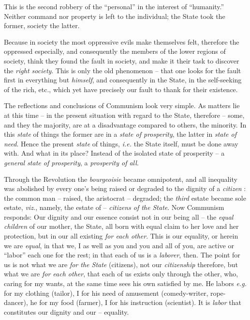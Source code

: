 \documentclass[12pt,a4paper]{book}
\begin{document}
This is the second robbery of the ``personal'' in the interest of 
``humanity.'' Neither command nor property is left to the individual; the 
State took the former, society the latter.

Because in society the most oppressive evils make themselves felt, therefore 
the oppressed especially, and consequently the members of the lower regions of 
society, think they found the fault in society, and make it their task to 
discover the \textit{right society}. This is only the old phenomenon -- that 
one looks for the fault first in everything but \textit{himself}, and 
consequently in the State, in the self-seeking of the rich, etc., which yet 
have precisely our fault to thank for their existence.

 The reflections and conclusions of Communism look very simple. As matters lie 
at this time -- in the present situation with regard to the State, therefore 
-- some, and they the majority, are at a disadvantage compared to others, the 
minority. In this \textit{state} of things the former are in a \textit{state 
of prosperity}, the latter in \textit{state of need}. Hence the present 
\textit{state} of things, \textit{i.e.} the State itself, must be done away 
with. And what in its place? Instead of the isolated state of prosperity -- a 
\textit{general state of prosperity}, a \textit{prosperity of all}.

Through the Revolution the \textit{bourgeoisie} became omnipotent, and all 
inequality was abolished by every one's being raised or degraded to the 
dignity of a \textit{citizen} : the common man -- raised, the aristocrat -- 
degraded; the \textit{third} estate became sole estate, \textit{viz.}, namely, 
the estate of -- \textit{citizens of the State}. Now Communism responds: Our 
dignity and our essence consist not in our being all -- the \textit{equal 
children} of our mother, the State, all born with equal claim to her love and 
her protection, but in our all existing \textit{for each other}. This is our 
equality, or herein we are \textit{equal}, in that we, I as well as you and 
you and all of you, are active or ``labor'' each one for the rest; in that 
each of us is a \textit{laborer}, then. The point for us is not what we are 
\textit{for the State} (citizens), not our \textit{citizenship} therefore, but 
what we are \textit{for each other}, that each of us exists only through the 
other, who, caring for my wants, at the same time sees his own satisfied by 
me. He labors \textit{e.g.} for my clothing (tailor), I for his need of 
amusement (comedy-writer, rope-dancer), he for my food (farmer), I for his 
instruction (scientist). It is \textit{labor} that constitutes our dignity and 
our -- equality.
\end{document}
